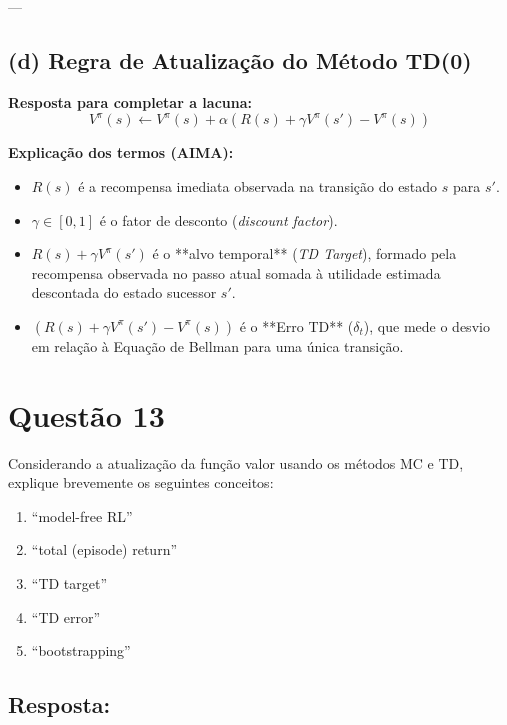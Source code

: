 \documentclass[a4paper,12pt]{article}
\begin{document}
---

\subsection*{(d) Regra de Atualização do Método TD(0)}
\textbf{Resposta para completar a lacuna:}
\begin{equation}
	V^\pi(s) \leftarrow V^\pi(s) + \alpha \left( R(s) + \gamma V^\pi(s') - V^\pi(s) \right)
\end{equation}

\textbf{Explicação dos termos (AIMA):}
\begin{itemize}
	\item $R(s)$ é a recompensa imediata observada na transição do estado $s$ para $s'$.
	\item $\gamma \in [0, 1]$ é o fator de desconto (\textit{discount factor}).
	\item $R(s) + \gamma V^\pi(s')$ é o **alvo temporal** (\textit{TD Target}), formado pela recompensa observada no passo atual somada à utilidade estimada descontada do estado sucessor $s'$.
	\item $\left( R(s) + \gamma V^\pi(s') - V^\pi(s) \right)$ é o **Erro TD** ($\delta_t$), que mede o desvio em relação à Equação de Bellman para uma única transição.
\end{itemize}

\section*{Questão 13}


Considerando a atualização da função valor usando os métodos MC e TD, explique brevemente os seguintes conceitos:
\begin{enumerate}
	\item[\textbf{a.}] ``model-free RL''
	\item[\textbf{b.}] ``total (episode) return''
	\item[\textbf{c.}] ``TD target''
	\item[\textbf{d.}] ``TD error''
	\item[\textbf{e.}] ``bootstrapping''
\end{enumerate}

\subsection*{Resposta:}

\bigskip
\end{document}
